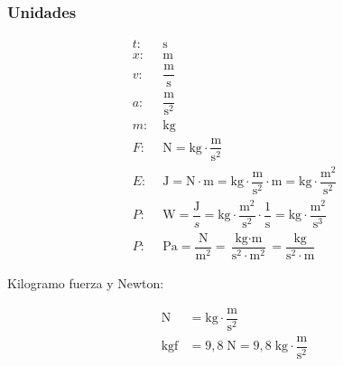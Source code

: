 \subsubsection*{Unidades}

\vspace{-3em}
\begin{align*}
t:\;& \text{s}\\
x:\;& \text{m}\\
v:\;& \dfrac{\text{m}}{\text{s}}\\
a:\;& \dfrac{\text{m}}{\text{s}^2}\\
m:\;& \text{kg}\\
F:\;&  \text{N} = \text{kg}\cdot \dfrac{\text{m}}{\text{s}^2}\\
E:\;&  \text{J} = \text{N}\cdot\text{m} = \text{kg}\cdot \dfrac{\text{m}}{\text{s}^2} \cdot \text{m} = \text{kg}\cdot \dfrac{\text{m}^2}{\text{s}^2}\\
P:\;& \text{W} = \dfrac{\text{J}}{s} = \text{kg}\cdot \dfrac{\text{m}^2}{\text{s}^2} \cdot \dfrac{1}{\text{s}} = \text{kg}\cdot \dfrac{\text{m}^2}{\text{s}^3}\\
P:\;&\text{Pa} = \dfrac{\text{N}}{\text{m}^2} = \dfrac{\text{kg}\cdot \text{m}}{\text{s}^2 \cdot \text{m}^2} = \dfrac{\text{kg}}{\text{s}^2 \cdot \text{m}}
\end{align*}

Kilogramo fuerza y Newton:

\begin{align*}
    \text{N} &= \text{kg} \cdot \dfrac{\text{m}}{\text{s}^2}\\
    \text{kgf} &= 9,8 \;\text{N} = 9,8\;\text{kg} \cdot \dfrac{\text{m}}{\text{s}^2} \\
\end{align*}

\newpage

